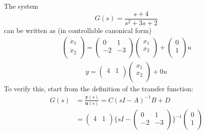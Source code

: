 \begin{itemize}
    \begin{ex}{}
    The system
    \[G(s) = \frac{s+4}{s^{2}+3s+2}\]
    can be written as (in controllable canonical form)
    \begin{gather*}
    \begin{pmatrix}
    \dot{x}_{1}\\
    \dot{x}_{2}\\
    \end{pmatrix} = 
    \begin{pmatrix}
    0&1\\
    -2&-3\\
    \end{pmatrix}
    \begin{pmatrix}
    x_{1}\\
    x_{2}\\
    \end{pmatrix}
    +
    \begin{pmatrix}
    0\\
    1\\
    \end{pmatrix}u
    \end{gather*}
    \begin{gather*}
    y = 
    \begin{pmatrix}
    4&1\\
    \end{pmatrix}
    \begin{pmatrix}
    x_{1}\\
    x_{2}\\
    \end{pmatrix}
    +0u
    \end{gather*}
    To verify this, start from the definition of the transfer function:
    \begin{equation*}
    \begin{aligned}
    G(s) &= \frac{\mathbf{y}(s)}{\mathbf{u}(s)} = C(sI-A)^{-1}B+D\\
    &= \begin{pmatrix}
     4 & 1\\
    \end{pmatrix}
    \{sI-\begin{pmatrix}
    0&1\\
    -2&-3\\
    \end{pmatrix}
    \}^{-1}
    \begin{pmatrix}
    0\\
    1\\

\end{pmatrix}
\end{aligned}
\end{equation*}
\end{ex}
\end{itemize}
